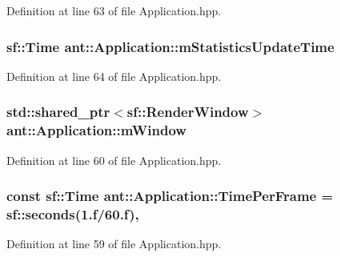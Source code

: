 Definition at line 63 of file Application.\+hpp.

\hypertarget{classant_1_1_application_a85a5669b50f423d557deab7c0315a0f7}{
\subsubsection[{m\+Statistics\+Update\+Time}]{\setlength{\rightskip}{0pt plus 5cm}sf\+::\+Time ant\+::\+Application\+::m\+Statistics\+Update\+Time\hspace{0.3cm}{\ttfamily [private]}}}\label{classant_1_1_application_a85a5669b50f423d557deab7c0315a0f7}


Definition at line 64 of file Application.\+hpp.

\hypertarget{classant_1_1_application_a6050fab136705ac705b727da336bb586}{
\subsubsection[{m\+Window}]{\setlength{\rightskip}{0pt plus 5cm}std\+::shared\+\_\+ptr$<$sf\+::\+Render\+Window$>$ ant\+::\+Application\+::m\+Window\hspace{0.3cm}{\ttfamily [private]}}}\label{classant_1_1_application_a6050fab136705ac705b727da336bb586}


Definition at line 60 of file Application.\+hpp.

\hypertarget{classant_1_1_application_a4b9bf663914a5195a2b4a699c81efd22}{
\subsubsection[{Time\+Per\+Frame}]{\setlength{\rightskip}{0pt plus 5cm}const sf\+::\+Time ant\+::\+Application\+::\+Time\+Per\+Frame = sf\+::seconds(1.f/60.f)\hspace{0.3cm}{\ttfamily [static]}, {\ttfamily [private]}}}\label{classant_1_1_application_a4b9bf663914a5195a2b4a699c81efd22}


Definition at line 59 of file Application.\+hpp.

